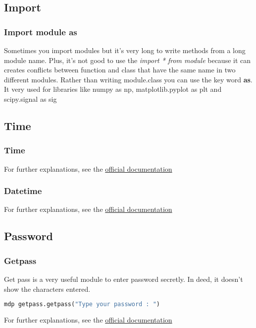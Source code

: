 \documentclass[a4paper, 12pt, titlepage]{scrartcl} %
\begin{document}
\subsection{Import}
\label{subsec:Import}

\subsubsection{Import module as}
Sometimes you import modules but it's very long to write methods from a long module name. Plus, it's not good to use the \textit{import * from module} because it can creates conflicts between function and class that have the same name in two different modules. Rather than writing module.class you can use the key word \textbf{as}. It very used for libraries like numpy as np, matplotlib.pyplot as plt and scipy.signal as sig
\label{As}

\subsection{Time}
\subsubsection{Time}
For further explanations, see the \href{https://docs.python.org/3/library/time.html}{official documentation}

\subsubsection{Datetime}
For further explanations, see the \href{https://docs.python.org/3/library/datetime.html}{official documentation}

\subsection{Password}

\subsubsection{Getpass}
Get pass is a very useful module to enter password secretly. In deed, it doesn't show the characters entered.
\begin{lstlisting}[language=Python]
mdp getpass.getpass("Type your password : ")
\end{lstlisting}

For further explanations, see the \href{https://docs.python.org/3/library/getpass.html}{official documentation}
\end{document}
